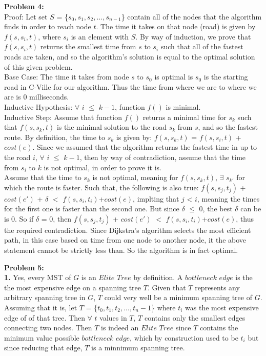 \documentclass{article}
\begin{document}
\textbf{Problem 4:}\\
Proof: Let set $S$ = \{$s_0, s_1, s_2, ... ,s_{n-1}$\} contain all of the nodes that the algorithm finds in order to reach node $t$. The time it takes on that node (road) is given by $f(s, s_i, t)$, where $s_i$ is an element with $S$. By way of induction, we prove that $f(s, s_i, t)$ returns the smallest time from $s$ to $s_i$ such that all of the fastest roads are taken, and so the algorithm's solution is equal to the optimal solution of this given problem.\\
Base Case: The time it takes from node $s$ to $s_0$ is optimal is $s_0$ is the starting road in C-Ville for our algorithm. Thus the time from where we are to where we are is 0 milliseconds.\\
Inductive Hypothesis: $\forall$ $i$ $\leq$ $k-1$, function $f()$ is minimal.\\
Inductive Step: Assume that function $f()$ returns a minimal time for $s_k$ such that $f(s, s_k, t)$ is the minimal solution to the road $s_k$ from $s$, and so the fastest route. By definition, the time to $s_k$ is given by: $f(s, s_k, t)$ = $f(s, s_i, t)$ + $cost(e)$. Since we assumed that the algorithm returns the fastest time in up to the road $i$, $\forall$ $i$ $\leq$ $k-1$, then by way of contradiction, assume that the time from $s_i$ to $k$ is not optimal, in order to prove it is.\\

Assume that the time to $s_k$ is not optimal, meaning for $f(s, s_k, t)$, $\exists$ $s_{k'}$ for which the route is faster. Such that, the following is also true: $f(s, s_j, t_j)$ + $cost(e')$ + $\delta$ $<$ $f(s, s_i, t_i)$+$cost(e)$, implting that $j$ < $i$, meaning the times for the first one is faster than the second one. But since $\delta$ $\leq$ 0, the best $\delta$ can be is 0. So if $\delta$ = 0, then $f(s, s_j, t_j)$ + $cost(e')$ $<$ $f(s, s_i, t_i)$+$cost(e)$, thus the required contradiction. Since Dijkstra's algorithm selects the most efficient path, in this case based on time from one node to another node, it the above statement cannot be strictly less than. So the algorithm is in fact optimal. 

\textbf{Problem 5:}\\
\textbf{1.} Yes, every MST of $G$ is an $Elite$ $Tree$ by definition. A $bottleneck$ $edge$ is the the most expensive edge on a spanning tree $T$. Given that $T$ represents any arbitrary spanning tree in $G$, $T$ could very well be a minimum spanning tree of $G$. Assuming that it is, let $T$ = \{$t_0, t_1, t_2,...,t_n-1$\} where $t_i$ was the most expensive edge of of that tree. Then $\forall$ $t$ values in $T$, $T$ contains only the smallest edges connecting two nodes. Then $T$ is indeed an $Elite$ $Tree$ since $T$ contains the minimum value possible $bottleneck$ $edge$, which by construction used to be $t_i$ but since reducing that edge, $T$ is a minnimum spanning tree.
\end{document}

